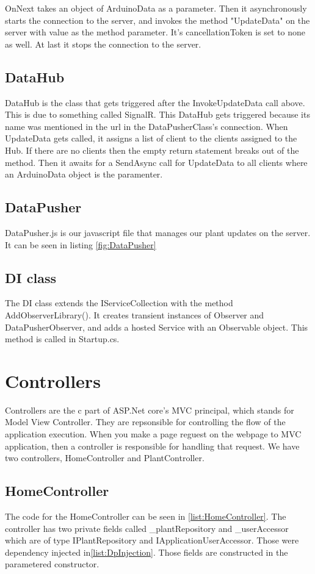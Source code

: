 \documentclass[a4paper,12pt,twoside,openright,titlepage]{book}
\begin{document}
OnNext takes an object of ArduinoData as a parameter. Then it asynchronously starts the connection to the server, and invokes the method "UpdateData" on the server with value as the method parameter. It's cancellationToken is set to none as well. At last it stops the connection to the server. 

\subsection{DataHub}
DataHub is the class that gets triggered after the InvokeUpdateData call above. This is due to something called SignalR. This DataHub gets triggered because its name was mentioned in the url in the DataPusherClass's connection. When UpdateData gets called, it assigns a list of client to the clients assigned to the Hub. If there are no clients then the empty return statement breaks out of the method. Then it awaits for a SendAsync call for UpdateData to all clients where an ArduinoData object is the paramenter.

\subsection{DataPusher}
DataPusher.js is our javascript file that manages our plant updates on the server. It can be seen in listing \ref{fig:DataPusher}

\subsection{DI class}
The DI class extends the IServiceCollection with the method AddObserverLibrary(). It creates transient instances of Observer and DataPusherObserver, and adds a hosted Service with an Observable object. This method is called in Startup.cs.


\section{Controllers}
Controllers are the c part of ASP.Net core's MVC principal, which stands for Model View Controller. They are repsonsible for controlling the flow of the application execution. When you make a page reguest on the webpage to MVC application, then a controller is responsible for handling that request. We have two controllers,  HomeController and PlantController.
\subsection{HomeController}
The code for the HomeController can be seen in \ref{list:HomeController}. The controller has two private fields called \_plantRepository and \_userAccessor which are of type IPlantRepository and IApplicationUserAccessor. Those were dependency injected in\ref{list:DpInjection}. Those fields are constructed in the parametered constructor. 
\end{document}
